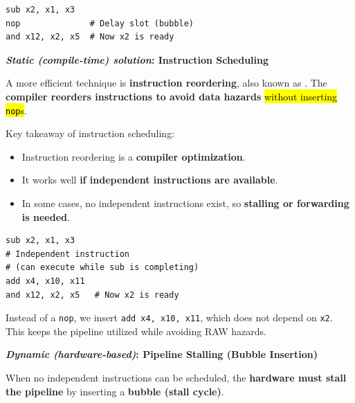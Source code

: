 \begin{examplebox}
    \begin{lstlisting}[language=riscv]
sub x2, x1, x3
nop              # Delay slot (bubble)
and x12, x2, x5  # Now x2 is ready\end{lstlisting}
\end{examplebox}

\highspace
\begin{flushleft}
    \textcolor{Green3}{ \textbf{\emph{Static (compile-time) solution}: Instruction Scheduling}}
\end{flushleft}
A more efficient technique is \textbf{instruction reordering}, also known as . The \textbf{compiler reorders instructions to avoid data hazards} \hl{without inserting \texttt{nop}s}.

\highspace
Key takeaway of instruction scheduling:
\begin{itemize}
    \item Instruction reordering is a \textbf{compiler optimization}.
    \item[\textcolor{Green3}{\faIcon{check}}] It works well \textbf{if independent instructions are available}.
    \item[\textcolor{Red2}{\faIcon{times}}] In some cases, no independent instructions exist, so \textbf{stalling or forwarding is needed}.
\end{itemize}

\begin{examplebox}
    \begin{lstlisting}[language=riscv]
sub x2, x1, x3
# Independent instruction
# (can execute while sub is completing)
add x4, x10, x11
and x12, x2, x5   # Now x2 is ready\end{lstlisting}
    Instead of a \texttt{nop}, we insert \texttt{add x4, x10, x11}, which does not depend on \texttt{x2}. This keeps the pipeline utilized while avoiding RAW hazards.
\end{examplebox}

\highspace
\begin{flushleft}
    \textcolor{Green3}{ \textbf{\emph{Dynamic (hardware-based)}: Pipeline Stalling (Bubble Insertion)}}
\end{flushleft}
When no independent instructions can be scheduled, the \textbf{hardware must stall the pipeline} by inserting a \textbf{bubble (stall cycle)}.

